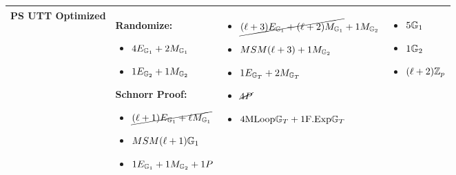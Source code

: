 {\begin{figure}
\begin{tabular}{|l|p{4.5cm}|p{4.5cm}|p{3.5cm}|}
             PS UTT Optimized &
            \textbf{Randomize:}
            \begin{itemize}[nosep]
                \item $4E_{\mathbb{G}_1} + 2M_{\mathbb{G}_1}$ 
                \item $1E_{\mathbb{G}_2} + 1M_{\mathbb{G}_2}$
            \end{itemize}
            \textbf{Schnorr Proof:}
            \begin{itemize}[nosep]
                \item $\cancel{(\ell+1)E_{\mathbb{G}_1} + \ell M_{\mathbb{G}_1}}$
                \item $MSM(\ell + 1)\mathbb{G}_1$ 
                \item $1E_{\mathbb{G}_1} + 1M_{\mathbb{G}_2} + 1P$ 
            \end{itemize}
            &
            \begin{itemize}[nosep]
                \item $\cancel{(\ell+3)E_{\mathbb{G}_1} + (\ell+2)M_{\mathbb{G}_1}} + 1M_{\mathbb{G}_2}$
                \item $MSM(\ell+3) + 1M_{\mathbb{G}_2}$
                \item $1E_{\mathbb{G}_T} + 2M_{\mathbb{G}_T}$
                \item $\cancel{4P}$ 
                \item $4\text{MLoop}\mathbb{G}_T + 1\text{F.Exp}\mathbb{G}_T$ 
            \end{itemize}
            &
            \begin{itemize}[nosep]
                \item $5\mathbb{G}_1$
                \item $1\mathbb{G}_2$
                \item $(\ell+2)\mathbb{Z}_p$
            \end{itemize}
            \\
             \hline
        \end{tabular}
\end{figure}

% 
% 




























}
